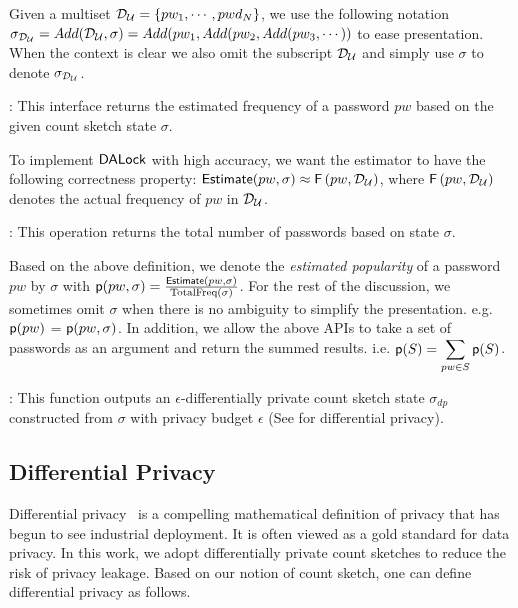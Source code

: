 Given a multiset $\mathcal{D}_{{\mathcal{U}}} = \{pw_1,\cdots,pwd_N\}$, we use the following notation $\sigma_{\mathcal{D}_{{\mathcal{U}}}} =  Add(\mathcal{D}_{{\mathcal{U}}},\sigma) \\= Add(pw_1, Add(pw_2,Add(pw_3,\cdots))$ to ease presentation. When the context is clear we also omit the subscript $\mathcal{D}_{{\mathcal{U}}}$ and simply use $\sigma$ to denote $\sigma_{\mathcal{D}_{{\mathcal{U}}}}$.


: This interface returns the estimated frequency of a password $pw$ based on the given count sketch state $\sigma$.


To implement $\mathsf{DALock}$ with high accuracy, we want the estimator to have the following correctness property: $\textsf{Estimate}(pw,\sigma) \approx \mathsf{F}\left(pw, \mathcal{D}_{{\mathcal{U}}} \right)$, where $\mathsf{F}\left(pw, \mathcal{D}_{{\mathcal{U}}}\right)$ denotes the actual frequency of $pw$ in $\mathcal{D}_{{\mathcal{U}}}$.


: This operation returns the total number of passwords based on state $\sigma$.


Based on the above definition, we denote the \emph{estimated popularity} of a password $pw$ by $\sigma$ with $\textsf{p}(pw,\sigma) = \frac{\textsf{Estimate}(pw,\sigma)}{\text{TotalFreq}(\sigma)}$. For the rest of the discussion, we sometimes omit $\sigma$ when there is no ambiguity to simplify the presentation. e.g. $\textsf{p}(pw)$ = $\textsf{p}(pw,\sigma)$. In addition, we allow the above APIs to take a set of passwords as an argument and return the summed results. i.e. $\textsf{p}(S) = \displaystyle{\sum_{pw \in S} \textsf{p}(S)}$. 


: This function outputs an $\epsilon$-differentially private count sketch state $\sigma_{dp}$ constructed from $\sigma$ with privacy budget $\epsilon$ (See  for differential privacy).

\vspace*{-\baselineskip}
\subsection{Differential Privacy} \label{section:Prelinmaries-DiffernetialPrivacy}

Differential privacy~\cite{ECS:Dwork11} is a compelling mathematical definition of privacy that has begun to see industrial deployment\cite{CCS:ErlPihKor14}. It is often viewed as a gold standard for data privacy.  In this work, we adopt differentially private count sketches to reduce the risk of privacy leakage. Based on our notion of count sketch, one can define differential privacy as follows.

